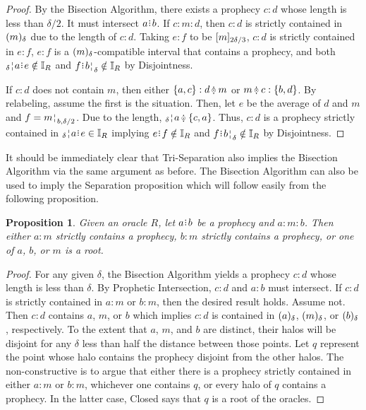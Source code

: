 \documentclass[12pt]{article}
\newtheorem{proposition}{Proposition}[section]
\begin{document}
\begin{proof}
    By the Bisection Algorithm, there exists a prophecy $c:d$ whose length is less than $\delta/2$. It must intersect $a \rint b$. If $c:m:d$, then $c:d$ is strictly contained in $\halo{m}$ due to the length of $c:d$. Taking $e:f$ to be  $\clhalo[2 \delta/3]{m}$, $c:d$ is strictly contained in $e:f$, $e:f$ is a $\halo{m}$-compatible interval that contains a prophecy, and both  $\fuzbleft{a}\rint e \notin \mathbb{I}_R$ and $f\rint \fuzbright{b} \notin \mathbb{I}_R$ by Disjointness. 
    
     If $c:d$ does not contain $m$, then either $\{a, c\}:d\betneq m$ or $m \betneq c : \{b, d\}$. By relabeling, assume the first is the situation. Then, let $e$ be the average of $d$ and $m$ and $f = \fuzbright[b, \delta/2]{m}$. Due to the length, $\fuzbleft{a} \betneq \{c, a\}$. Thus, $c:d$ is a prophecy strictly contained in  $\fuzbleft{a}\rint e \in \mathbb{I}_R$ implying $e\rint f \notin \mathbb{I}_R$ and  $f\rint \fuzbright{b} \notin \mathbb{I}_R$ by Disjointness.
\end{proof}


It should be immediately clear that Tri-Separation also implies the Bisection Algorithm via the same argument as before. The Bisection Algorithm can also be used to imply the Separation proposition which will follow easily from the following proposition. 

\begin{proposition}
    Given an oracle $R$, let $a \rint b$ be a prophecy and $a : m : b$. Then either $a:m$ strictly contains a prophecy, $b:m$ strictly contains a prophecy, or one of $a$, $b$, or $m$ is a root. 
\end{proposition}

\begin{proof}
    For any given $\delta$, the Bisection Algorithm yields a prophecy $c:d$ whose length is less than $\delta$. By Prophetic Intersection, $c:d$ and $a:b$ must intersect. If $c:d$ is strictly contained in $a:m$ or $b:m$, then the desired result holds. Assume not. Then $c:d$ contains $a$, $m$, or $b$ which implies $c:d$ is contained in $\halo{a}$, $\halo{m}$, or $\halo{b}$, respectively. To the extent that $a$, $m$, and $b$ are distinct, their halos will be disjoint for any $\delta$ less than half the distance between those points. Let $q$ represent the point whose halo contains the prophecy disjoint from the other halos. The non-constructive is to argue that either there is a prophecy strictly contained in either $a:m$ or $b:m$, whichever one contains $q$, or every halo of $q$ contains a prophecy. In the latter case, Closed says that $q$ is a root of the oracles.  
\end{proof}
\end{document}
